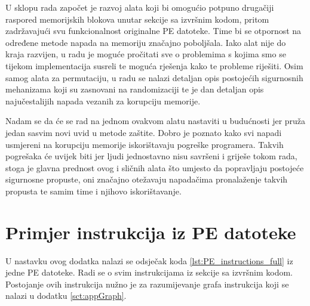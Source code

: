 \documentclass[times, utf8, diplomski, numeric]{fer}
\begin{document}
U sklopu rada započet je razvoj alata koji bi omogućio potpuno drugačiji raspored memorijskih blokova unutar sekcije sa izvršnim kodom, pritom zadržavajući svu funkcionalnost originalne PE datoteke. Time bi se otpornost na određene metode napada na memoriju značajno poboljšala. Iako alat nije do kraja razvijen, u radu je moguće pročitati sve o problemima s kojima smo se tijekom implementacija susreli te moguća rješenja kako te probleme riješiti. Osim samog alata za permutaciju, u radu se nalazi detaljan opis postojećih sigurnosnih mehanizama koji su zasnovani na randomizaciji te je dan detaljan opis najučestalijih napada vezanih za korupciju memorije.

Nadam se da će se rad na jednom ovakvom alatu nastaviti u budućnosti jer pruža jedan sasvim novi uvid u metode zaštite. Dobro je poznato kako svi napadi usmjereni na korupciju memorije iskorištavaju pogreške programera. Takvih pogrešaka će uvijek biti jer ljudi jednostavno nisu savršeni i griješe tokom rada, stoga je glavna prednost ovog i sličnih alata što umjesto da popravljaju postojeće sigurnosne propuste, oni značajno otežavaju napadačima pronalaženje takvih propusta te samim time i njihovo iskorištavanje.


\nocite{*}


\appendix
\chapter{Primjer instrukcija iz PE datoteke}
\label{sct:appPE}
U nastavku ovog dodatka nalazi se odsječak koda \ref{lst:PE_instructions_full} iz jedne PE datoteke. Radi se o svim instrukcijama iz sekcije sa izvršnim kodom. Postojanje ovih instrukcija nužno je za razumijevanje grafa instrukcija koji se nalazi u dodatku \ref{sct:appGraph}.
\end{document}

